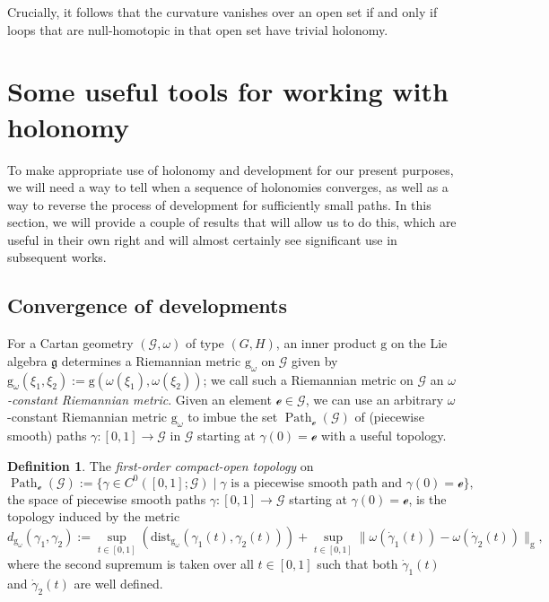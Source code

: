 \documentclass[pdftex]{sigma}
\numberwithin{equation}{section}
\theoremstyle{definition}
\newtheorem{Definition}[Theorem]{Definition}
\DeclareMathOperator{\Path}{Path}
\begin{document}
Crucially, it follows that the curvature vanishes over an open set if and only if loops that are null-homotopic in that open set have trivial holonomy.

\section{Some useful tools for working with holonomy}\label{devtools}
To make appropriate use of holonomy and development for our present purposes, we will need a way to tell when a sequence of holonomies converges, as well as a way to reverse the process of development for sufficiently small paths. In this section, we will provide a couple of results that will allow us to do this, which are useful in their own right and will almost certainly see significant use in subsequent works.

\subsection{Convergence of developments}
For a Cartan geometry $(\mathscr{G},\omega)$ of type $(G,H)$, an inner product $\mathrm{g}$ on the Lie algebra $\mathfrak{g}$ determines a Riemannian metric $\mathrm{g}_\omega$ on $\mathscr{G}$ given by $\mathrm{g}_\omega(\xi_1,\xi_2):=\mathrm{g}(\omega(\xi_1),\omega(\xi_2))$; we call such a Riemannian metric on $\mathscr{G}$ an \emph{$\omega$-constant Riemannian metric}. Given an element $\mathscr{e}\in\mathscr{G}$, we can use an arbitrary $\omega$-constant Riemannian metric $\mathrm{g}_\omega$ to imbue the set $\Path_\mathscr{e}(\mathscr{G})$ of (piecewise smooth) paths $\gamma \colon [0,1]\to\mathscr{G}$ in $\mathscr{G}$ starting at $\gamma(0)=\mathscr{e}$ with a useful topology.

\begin{Definition}The \emph{first-order compact-open topology} on \[\Path_\mathscr{e}(\mathscr{G}):=\bigl\{\gamma\in C^0([0,1];\mathscr{G})\mid  \gamma\text{ is a piecewise smooth path and }\gamma(0)=\mathscr{e} \bigr\},\] the space of piecewise smooth paths $\gamma \colon [0,1]\to\mathscr{G}$ starting at $\gamma(0)=\mathscr{e}$, is the topology induced by the metric \[d_{\mathrm{g}_\omega}(\gamma_1,\gamma_2):=\sup_{t\in[0,1]} (\mathrm{dist}_{\mathrm{g}_\omega}(\gamma_1(t), \gamma_2(t)) )+\sup_{t\in[0,1]}\|\omega(\dot{\gamma}_1(t))-\omega(\dot{\gamma}_2(t))\|_\mathrm{g},\] where the second supremum is taken over all $t\in[0,1]$ such that both $\dot{\gamma}_1(t)$ and $\dot{\gamma}_2(t)$ are well defined.
\end{Definition}
\end{document}

